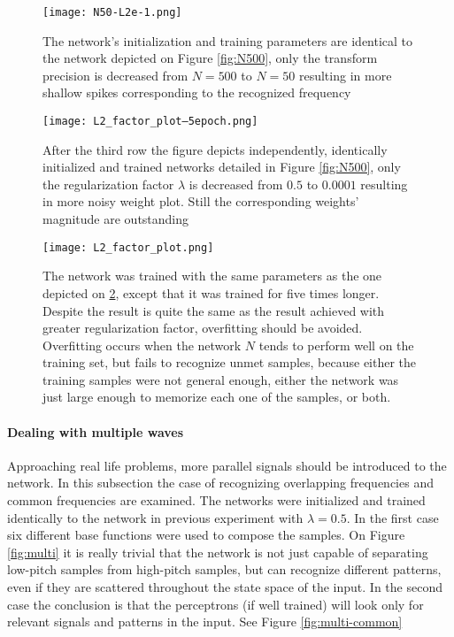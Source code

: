 \begin{figure}
	\centering
	\texttt{[image: N50-L2e-1.png]}
	\caption{The network's initialization and training parameters are identical to the network depicted on Figure \ref{fig:N500}, only the transform precision is decreased from $N=500$ to $N=50$ resulting in more shallow spikes corresponding to the recognized frequency}
	
	\label{fig:N50}
\end{figure}

\begin{figure}
	\centering
	\texttt{[image: L2\_factor\_plot--5epoch.png]}
	\caption{After the third row the figure depicts independently, identically initialized and trained networks detailed in Figure \ref{fig:N500}, only the regularization factor $\lambda$ is decreased from $0.5$ to $0.0001$ resulting in more noisy weight plot. Still the  corresponding weights' magnitude are outstanding}
	
	\label{fig:reg}
\end{figure}

\begin{figure}
	\centering
	\texttt{[image: L2\_factor\_plot.png]}
	\caption{The network was trained with the same parameters as the one depicted on \ref{fig:reg}, except that it was trained for five times longer. Despite the result is quite the same as the result achieved with greater regularization factor, overfitting should be avoided. Overfitting occurs when the network $N$ tends to perform well on the training set, but fails to recognize unmet samples, because either the training samples were not general enough, either the network was just large enough to memorize each one of the samples, or both. }
	
	\label{fig:overtrain}
\end{figure}


\paragraph{Dealing with multiple waves}
Approaching real life problems, more parallel signals should be introduced to the network. In this subsection the case of recognizing overlapping frequencies and common frequencies are examined. The networks were initialized and trained identically to the network in previous experiment with $\lambda=0.5$. In the first case six different base functions were used to compose the samples. On Figure \ref{fig:multi} it is really trivial that the network is not just capable of separating low-pitch samples from high-pitch samples, but can recognize different patterns, even if they are scattered throughout the state space of the input. In the second case the conclusion is that the perceptrons (if well trained) will look only for relevant signals and patterns in the input.  See Figure \ref{fig:multi-common}


